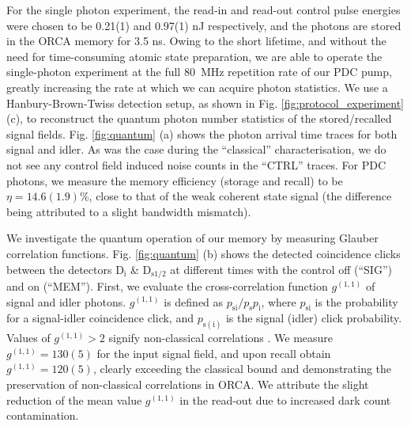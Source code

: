 \documentclass[%
 reprint,
 amsmath,amssymb,
 aps,
 pra,
]{revtex4-1}
\begin{document}
For the single photon experiment, the read-in and read-out control pulse energies were chosen to be 0.21(1) and 0.97(1) nJ respectively, and the photons are stored in the ORCA memory for 3.5 ns. Owing to the short lifetime, and without the need for time-consuming atomic state preparation, we are able to operate the single-photon experiment at the full 80~MHz repetition rate of our PDC pump, greatly increasing the rate at which we can acquire photon statistics. We use a Hanbury-Brown-Twiss detection setup, as shown in Fig. \ref{fig:protocol_experiment} (c), to reconstruct the quantum photon number statistics of the stored/recalled signal fields. Fig. \ref{fig:quantum} (a) shows the photon arrival time traces for both signal and idler. As was the case during the ``classical'' characterisation, we do not see any control field induced noise counts in the ``CTRL'' traces. For PDC photons, we measure the memory efficiency (storage and recall) to be $\eta=14.6(1.9)\%$, close to that of the weak coherent state signal (the difference being attributed to a slight bandwidth mismatch).

We investigate the quantum operation of our memory by measuring Glauber correlation functions. Fig. \ref{fig:quantum} (b) shows the detected coincidence clicks between the detectors $\mathrm{D_{i}}$ \& $\mathrm{D_{s1/2}}$ at different times with the control off (``SIG'') and on (``MEM''). First, we evaluate the cross-correlation function $g^{(1,1)}$ of signal and idler photons. $g^{(1,1)}$ is defined as $p_\mathrm{si}/p_\mathrm{s}p_\mathrm{i}$, where $p_\mathrm{si}$ is the probability for a signal-idler coincidence click, and $p_\mathrm{s(i)}$ is the signal (idler) click probability. Values of $g^{(1,1)}>2$ signify non-classical correlations \cite{Farrera2016}. We measure $g^{(1,1)}=130(5)$ for the input signal field, and upon recall obtain $g^{(1,1)}=120(5)$, clearly exceeding the classical bound and demonstrating the preservation of non-classical correlations in ORCA. We attribute the slight reduction of the mean value $g^{(1,1)}$ in the read-out due to increased dark count contamination.
\end{document}
